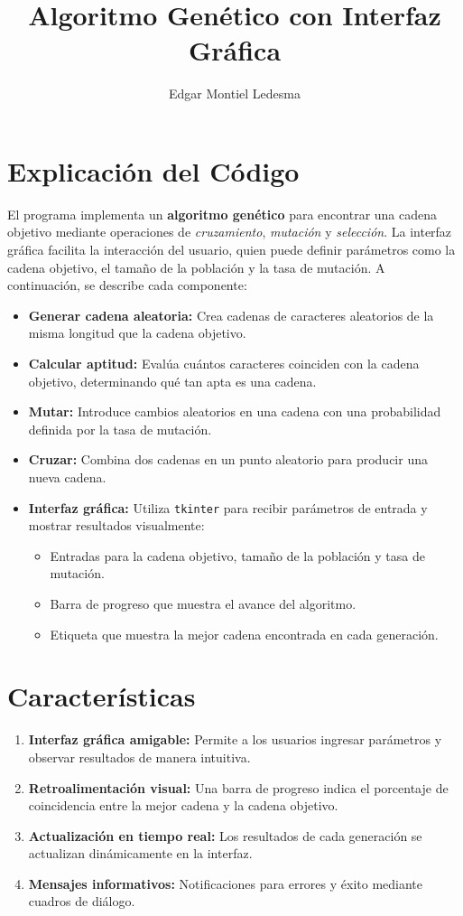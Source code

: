 \documentclass{article}
\title{Algoritmo Genético con Interfaz Gráfica}
\author{Edgar Montiel Ledesma}
\date{}
\begin{document}
\maketitle

\section*{Explicación del Código}

El programa implementa un \textbf{algoritmo genético} para encontrar una cadena objetivo mediante operaciones de \textit{cruzamiento}, \textit{mutación} y \textit{selección}. La interfaz gráfica facilita la interacción del usuario, quien puede definir parámetros como la cadena objetivo, el tamaño de la población y la tasa de mutación. A continuación, se describe cada componente:

\begin{itemize}
    \item \textbf{Generar cadena aleatoria:} Crea cadenas de caracteres aleatorios de la misma longitud que la cadena objetivo.
    \item \textbf{Calcular aptitud:} Evalúa cuántos caracteres coinciden con la cadena objetivo, determinando qué tan apta es una cadena.
    \item \textbf{Mutar:} Introduce cambios aleatorios en una cadena con una probabilidad definida por la tasa de mutación.
    \item \textbf{Cruzar:} Combina dos cadenas en un punto aleatorio para producir una nueva cadena.
    \item \textbf{Interfaz gráfica:} Utiliza \texttt{tkinter} para recibir parámetros de entrada y mostrar resultados visualmente:
    \begin{itemize}
        \item Entradas para la cadena objetivo, tamaño de la población y tasa de mutación.
        \item Barra de progreso que muestra el avance del algoritmo.
        \item Etiqueta que muestra la mejor cadena encontrada en cada generación.
    \end{itemize}
\end{itemize}

\section*{Características}

\begin{enumerate}
    \item \textbf{Interfaz gráfica amigable:} Permite a los usuarios ingresar parámetros y observar resultados de manera intuitiva.
    \item \textbf{Retroalimentación visual:} Una barra de progreso indica el porcentaje de coincidencia entre la mejor cadena y la cadena objetivo.
    \item \textbf{Actualización en tiempo real:} Los resultados de cada generación se actualizan dinámicamente en la interfaz.
    \item \textbf{Mensajes informativos:} Notificaciones para errores y éxito mediante cuadros de diálogo.
\end{enumerate}
\end{document}

